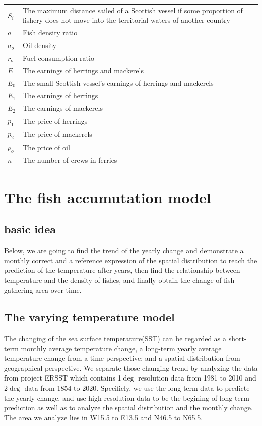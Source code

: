 \documentclass{mcmthesis}
\begin{document}
\begin{center}
\begin{longtable}{p{}p{}m{}}
$S_i$      & The maximum distance sailed of a Scottish vessel   if  some proportion of fishery does not move  into the territorial waters of another country \\
$a$      & Fish density ratio \\
$a_o$      & Oil density \\
$r_o$      & Fuel consumption ratio \\
$E$      & The earnings  of herrings and mackerels \\
$E_0$      & The small Scottish vessel's earnings  of herrings and mackerels \\
$E_1$      & The earnings  of herrings\\
$E_2$      & The earnings  of mackerels\\
$p_1$      & The price  of herrings \\
$p_2$      & The price  of mackerels  \\
$p_o$      & The price  of oil  \\
$n$      & The number  of  crews in ferries \\



 \end{longtable}
 \end{center}

 \section{The fish accumutation model}
 \subsection{basic idea}
   Below, we are going to find the trend of the yearly change and demonstrate a monthly correct and a reference expression of the spatial distribution to reach the prediction of the temperature after years, then find the relationship between temperature and the density of fishes, and finally obtain the change of fish gathering area over time. 
 \subsection{The varying temperature model}
 
  
    The changing of the sea surface temperature(SST) can be regarded as a short-term monthly average temperature change, a long-term yearly average temperature change from a time perspective; and a spatial distribution from geographical perspective. 
    We separate those changing trend by analyzing the data from project ERSST which contains 1$\deg$ resolution data from 1981 to 2010 and 2$\deg$ data from 1854 to 2020. Specificly, we use the long-term data to predicte the yearly change, and use high resolution data to be the begining of long-term prediction as well as to analyze the spatial distribution and the monthly change. The area we analyze lies in W15.5 to E13.5 and N46.5 to N65.5.
    
\end{document}
